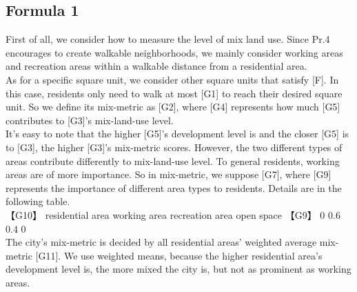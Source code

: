 \subsection{Formula 1}
First of all, we consider how to measure the level of mix land use.
Since Pr.4 encourages to create walkable neighborhoods, we mainly consider working areas and recreation areas within a walkable distance from a residential area.
\\
As for a specific square unit, we consider other square units that satisfy [F].
In this case, residents only need to walk at most [G1] to reach their desired square unit.
So we define its mix-metric as [G2], where [G4] represents how much [G5] contributes to [G3]'s mix-land-use level.
\\
It's easy to note that the higher [G5]'s development level is and the closer [G5] is to [G3], the higher [G3]'s mix-metric scores.
However, the two different types of areas contribute differently to mix-land-use level.
To general residents, working areas are of more importance.
So in mix-metric, we suppose [G7], where [G9] represents the importance of different area types to residents. Details are in the following table.
\\
【G10】  residential area      working area      recreation area        open space
【G9】       0                     0.6                0.4                    0
\\
The city's mix-metric is decided by all residential areas' weighted average mix-metric [G11].
We use weighted means, because the higher residential area's development level is, the more mixed the city is, but not as prominent as working areas.

